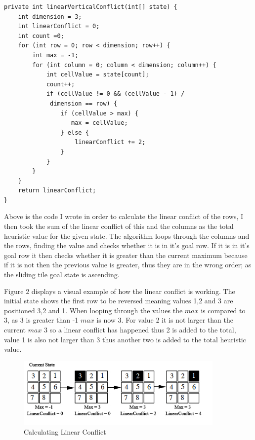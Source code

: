 \documentclass[final]{cmpreport}
\begin{document}
 
\begin{verbatim}
private int linearVerticalConflict(int[] state) {
    int dimension = 3;
    int linearConflict = 0;
    int count =0;
    for (int row = 0; row < dimension; row++) {
        int max = -1;
        for (int column = 0; column < dimension; column++) {
            int cellValue = state[count];
            count++;
            if (cellValue != 0 && (cellValue - 1) /
             dimension == row) {
                if (cellValue > max) {
                   max = cellValue;
                } else {
                    linearConflict += 2;
                }
            }
        }
    }
    return linearConflict;
}
\end{verbatim}

Above is the code I wrote in order to calculate the linear conflict of the rows, I then took the sum of the linear conflict of this and the columns as the total heuristic value for the given state. The algorithm loops through the columns and the rows, finding the value and checks whether it is in it's goal row. If it is in it's goal row it then checks whether it is greater than the current maximum because if it is not then the previous value is greater, thus they are in the wrong order; as the sliding tile goal state is ascending. 

Figure 2 displays a visual example of how the linear conflict is working. The initial state shows the first row to be reversed meaning values 1,2 and 3 are positioned 3,2 and 1. When looping through the values the $max$ is compared to 3, as 3 is greater than -1 $max$ is now 3. For value 2 it is not larger than the current $max$ 3 so a linear conflict has happened thus 2 is added to the total, value 1 is also not larger than 3 thus another two is added to the total heuristic value.


\begin{figure}[ht]
	\centering
	\includegraphics[width=0.9\textwidth]{linear}
	\captionsetup{justification=centering}
	\caption{Calculating Linear Conflict}
\end{figure}
\end{document}
